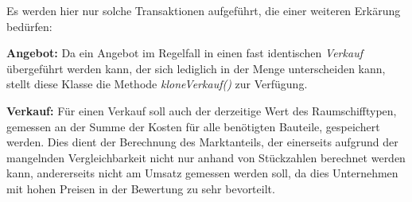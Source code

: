 Es werden hier nur solche Transaktionen aufgeführt, die einer weiteren Erkärung bedürfen:

\begin{seList}
\item \textbf{Angebot:} Da ein Angebot im Regelfall in einen fast identischen \textit{Verkauf} übergeführt werden kann, der sich lediglich in der Menge unterscheiden kann, stellt diese Klasse die Methode \textit{kloneVerkauf()} zur Verfügung.
\item \textbf{Verkauf:} Für einen Verkauf soll auch der derzeitige Wert des Raumschifftypen, gemessen an der Summe der Kosten für alle benötigten Bauteile, gespeichert werden. Dies dient der Berechnung des Marktanteils, der einerseits aufgrund der mangelnden Vergleichbarkeit nicht nur anhand von Stückzahlen berechnet werden kann, andererseits nicht am Umsatz gemessen werden soll, da dies Unternehmen mit hohen Preisen in der Bewertung zu sehr bevorteilt.
\end{seList}

\autorende{}